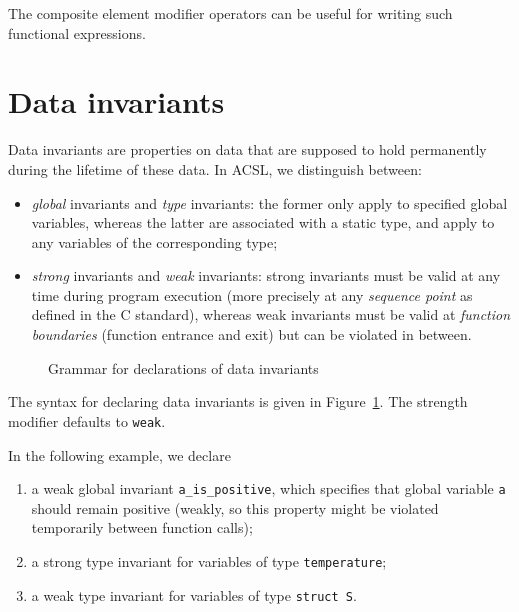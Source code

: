 \begin{example}
  The composite element modifier operators 
  can be useful for writing such functional expressions.
\end{example}

\section{Data invariants}
\label{sec:invariants}
Data invariants are properties on data that are supposed to hold
permanently during the lifetime of these data. In ACSL, we distinguish
between:
\begin{itemize}
\item \emph{global} invariants and \emph{type} invariants: the former
  only apply to specified global variables, whereas the latter are
  associated with a static type, and apply to any variables of
  the corresponding type;
\item \emph{strong} invariants and \emph{weak} invariants:
  strong
  invariants must be valid at any time during program execution
  (more precisely at any \emph{sequence point} as defined in the C
  standard), whereas weak invariants must be valid at \emph{function
    boundaries} (function entrance and exit) but can be violated in
  between.
\end{itemize}

\begin{figure}[t]
  \begin{cadre}
      
    \end{cadre}
  \caption{Grammar for declarations of data invariants}
\label{fig:gram:datainvariants}
\end{figure}

The syntax for declaring data invariants is given in
Figure~\ref{fig:gram:datainvariants}. The strength modifier defaults
to \texttt{weak}.


\begin{example}
  In the following example, we declare
  \begin{enumerate}
  \item a weak global invariant \lstinline|a_is_positive|, which specifies that
    global variable \lstinline|a| should remain positive (weakly, so
    this property might be violated temporarily between function
    calls);
  \item a strong type invariant for variables of type \lstinline|temperature|;
  \item a weak type invariant for variables of type \lstinline|struct S|.
  \end{enumerate}
\end{example}

